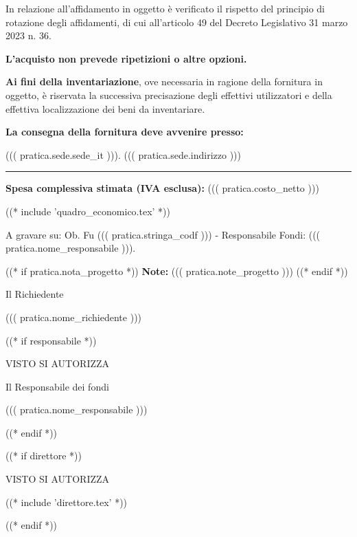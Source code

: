 \documentclass[a4paper,12pt]{letter}
\begin{document}
In relazione all’affidamento in oggetto è verificato il rispetto del
principio di rotazione degli affidamenti, di cui all’articolo 49 del
Decreto Legislativo 31 marzo 2023 n. 36. 

\textbf{L’acquisto non prevede ripetizioni o altre opzioni.}

\textbf{Ai fini della inventariazione}, ove necessaria in ragione della fornitura
in oggetto, è riservata la successiva precisazione degli effettivi
utilizzatori e della effettiva localizzazione dei beni da inventariare.

\textbf{La consegna della fornitura deve avvenire presso:}

((( pratica.sede.sede_it ))). ((( pratica.sede.indirizzo )))
\par\noindent\rule{\textwidth}{0.4pt}

\textbf{Spesa complessiva stimata (IVA esclusa):} ((( pratica.costo_netto ))) 

((* include 'quadro_economico.tex' *))

\begin{minipage}{\linewidth}
A gravare su: Ob. Fu ((( pratica.stringa_codf ))) - 
Responsabile Fondi: ((( pratica.nome_responsabile ))).

((* if pratica.nota_progetto *))
\vspace{0.5cm}
\textbf{Note:}
	((( pratica.note_progetto )))
((* endif *))

\vspace{0.5cm}
\begin{flushright}
\begin{minipage}[c]{6cm}
\begin{center}
Il Richiedente

((( pratica.nome_richiedente )))

\end{center}
\end{minipage}
\end{flushright}
\end{minipage}

((* if responsabile *))
\begin{minipage}{\linewidth}
\begin{center}
	VISTO SI AUTORIZZA
\end{center}
\begin{flushright}
\begin{minipage}[c]{6cm}
\begin{center}
Il Responsabile dei fondi

((( pratica.nome_responsabile )))

\end{center}
\end{minipage}
\end{flushright}
\end{minipage}
((* endif *))

((* if direttore *))
\begin{minipage}{\linewidth}
\begin{center}
	VISTO SI AUTORIZZA
\end{center}
((* include 'direttore.tex' *))
\end{minipage}
((* endif *))
\end{document}
